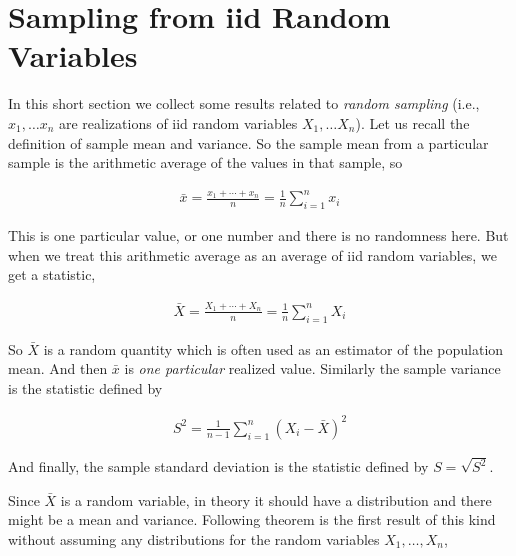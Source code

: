 \documentclass[ 11pt,%
				a4paper,%
				twoside,%
				headinclude,%
				footinclude = true,%
				cleardoublepage = empty,%
				reqno]{scrbook}
\begin{document}
\section{Sampling from iid Random Variables}


In this short section we collect some results related to \emph{random sampling} (i.e., $x_1, \ldots x_n$ are realizations of iid random variables $X_1, \ldots X_n$). Let us recall the definition of sample mean and variance. So the sample mean from a particular sample is the arithmetic average of the values in that sample, so

\begin{align*}
  \bar{x}=\frac{x_{1}+\cdots+x_{n}}{n}=\frac{1}{n} \sum_{i=1}^{n} x_{i}
\end{align*}

This is one particular value, or one number and there is no randomness here. But when we treat this arithmetic average as an average of iid random variables, we get a statistic,

\begin{align*}
  \bar{X}=\frac{X_{1}+\cdots+X_{n}}{n}=\frac{1}{n} \sum_{i=1}^{n} X_{i}
\end{align*}

So $\bar{X}$ is a random quantity which is often used as an estimator of the population mean. And then $\bar{x}$ is \emph{one particular} realized value. Similarly the sample variance is the statistic defined by

\begin{align*}
  S^{2}=\frac{1}{n-1} \sum_{i=1}^{n}\left(X_{i}-\bar{X}\right)^{2}
\end{align*}

And finally, the sample standard deviation is the statistic defined by $S=\sqrt{S^{2}}$.


Since $\bar{X}$ is a random variable, in theory it should have a distribution and there might be a mean and variance. Following theorem is the first result of this kind without assuming any distributions for the random variables $X_1, \ldots, X_n$,

\end{document}
